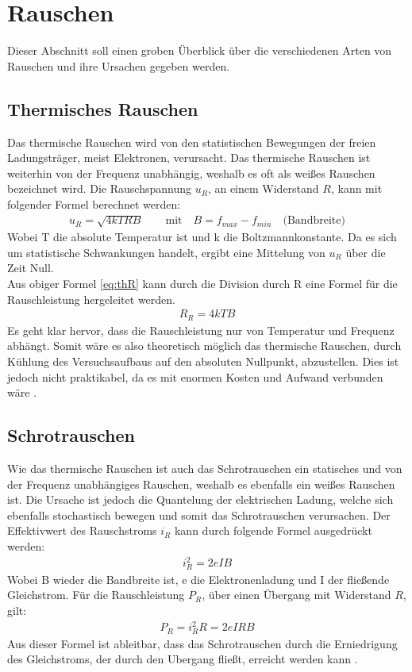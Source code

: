 
\section{Rauschen}

Dieser Abschnitt soll einen groben Überblick über die verschiedenen Arten von Rauschen und ihre Ursachen gegeben werden.

\subsection{Thermisches Rauschen}
Das thermische Rauschen wird von den statistischen Bewegungen der freien Ladungsträger, meist Elektronen, verursacht. Das thermische Rauschen ist weiterhin von der Frequenz unabhängig, weshalb es oft als weißes Rauschen bezeichnet wird.
Die Rauschspannung $u_R$, an einem Widerstand $R$, kann mit folgender Formel berechnet werden: 
\begin{align}
    u_R = \sqrt{4kTRB} \qquad \text{mit} \quad B = f_{max} - f_{min} \quad \text{(Bandbreite)}
    \label{eq:thR}
\end{align}
Wobei T die absolute Temperatur ist und k die Boltzmannkonstante. Da es sich um statistische Schwankungen handelt, ergibt eine Mittelung von $u_R$ über die Zeit Null.\\
Aus obiger Formel \ref{eq:thR} kann durch die Division durch R eine Formel für die Rauschleistung hergeleitet werden.
\begin{align}
    R_R = 4kTB
\end{align}
Es geht klar hervor, dass die Rauschleistung nur von Temperatur und Frequenz abhängt. Somit wäre es also theoretisch möglich das thermische Rauschen, durch Kühlung des Versuchsaufbaus auf den absoluten Nullpunkt, abzustellen. Dies ist jedoch nicht praktikabel, da es mit enormen Kosten und Aufwand verbunden wäre \citep{VA}.

\subsection{Schrotrauschen}
Wie das thermische Rauschen ist auch das Schrotrauschen ein statisches und von der Frequenz unabhängiges Rauschen, weshalb es ebenfalls ein weißes Rauschen ist. Die Ursache ist jedoch die Quantelung der elektrischen Ladung, welche sich ebenfalls stochastisch bewegen und somit das Schrotrauschen verursachen. Der Effektivwert des Rauschstroms $i_R$ kann durch folgende Formel ausgedrückt werden:
\begin{align}
    i_R^2 = 2eIB
\end{align}
Wobei B wieder die Bandbreite ist, e die Elektronenladung und I der fließende Gleichstrom.
Für die Rauschleistung $P_R$, über einen Übergang mit Widerstand $R$, gilt: 
\begin{align}
    P_R = i_R^2 R = 2eIRB
\end{align}
Aus dieser Formel ist ableitbar, dass das Schrotrauschen durch die Erniedrigung des Gleichstroms, der durch den Ubergang fließt, erreicht werden kann \citep{VA}.

